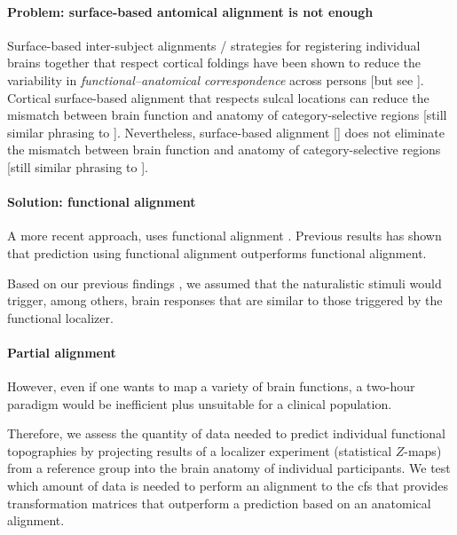 \paragraph{Problem: surface-based antomical alignment is not enough}
%
Surface-based inter-subject alignments / strategies for registering individual
brains together that respect cortical foldings \citep{fischl1999cortical,
yeo2009spherical} have been shown to reduce the variability in
\textit{functional--anatomical correspondence} \citep{feilong2018reliable,
kumar2020brainiak} across persons \citep{klein2010evaluation,
frost2012measuring} [but see \citep{langers2014assessment}].
%
Cortical surface-based alignment \citep{fischl2012freesurfer} that respects
sulcal locations can reduce the mismatch between brain function and anatomy of
category-selective regions \citep{duncan2009consistency, frost2012measuring,
weiner2018defining, weiner2014mid} [still similar phrasing to
\citep{feilong2018reliable}].
%
Nevertheless, surface-based alignment [\citep{fischl2012freesurfer}] does not
eliminate the mismatch between brain function and anatomy of category-selective
regions \citep{duncan2009consistency, frost2012measuring, weiner2018defining,
weiner2014mid}[still similar phrasing to \citep{feilong2018reliable}].

\paragraph{Solution: functional alignment}
%
A more recent approach, uses functional alignment \citep{haxby2020hyperalignment,
bazeille2021empirical}.
%
Previous results has shown that prediction using functional alignment
outperforms functional alignment.

Based on our previous findings \citep{haeusler2022processing}, we assumed that
the naturalistic stimuli would trigger, among others, brain responses that are
similar to those triggered by the functional localizer.


\paragraph{Partial alignment}
%
However, even if one wants to map a variety of brain functions, a two-hour
paradigm would be inefficient plus unsuitable for a clinical population.

%
Therefore, we assess the quantity of data needed
to predict individual functional topographies by projecting results of a
localizer experiment (statistical $Z$-maps) from a reference group into the
brain anatomy of individual participants.
%
We test which amount of data is needed to perform an alignment
to the \ac{cfs} that provides transformation matrices that
outperform a prediction based on an anatomical alignment.

